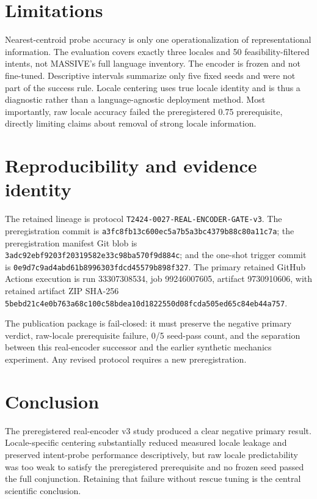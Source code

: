 \documentclass[10pt,twocolumn]{article}
\begin{document}
\section{Limitations}
Nearest-centroid probe accuracy is only one operationalization of representational information. The evaluation covers exactly three locales and 50 feasibility-filtered intents, not MASSIVE's full language inventory. The encoder is frozen and not fine-tuned. Descriptive intervals summarize only five fixed seeds and were not part of the success rule. Locale centering uses true locale identity and is thus a diagnostic rather than a language-agnostic deployment method. Most importantly, raw locale accuracy failed the preregistered 0.75 prerequisite, directly limiting claims about removal of strong locale information.

\section{Reproducibility and evidence identity}
The retained lineage is protocol \nolinkurl{T2424-0027-REAL-ENCODER-GATE-v3}. The preregistration commit is \nolinkurl{a3fc8fb13c600ec5a7b5a3bc4379b88c80a11c7a}; the preregistration manifest Git blob is \nolinkurl{3adc92ebf9203f20319582e33c98ba570f9d884c}; and the one-shot trigger commit is \nolinkurl{0e9d7c9ad4abd61b8996303fdcd45579b898f327}. The primary retained GitHub Actions execution is run 33307308534, job 99246007605, artifact 9730910606, with retained artifact ZIP SHA-256 \nolinkurl{5bebd21c4e0b763a68c100c58bdea10d1822550d08fcda505ed65c84eb44a757}.

The publication package is fail-closed: it must preserve the negative primary verdict, raw-locale prerequisite failure, 0/5 seed-pass count, and the separation between this real-encoder successor and the earlier synthetic mechanics experiment. Any revised protocol requires a new preregistration.

\section{Conclusion}
The preregistered real-encoder v3 study produced a clear negative primary result. Locale-specific centering substantially reduced measured locale leakage and preserved intent-probe performance descriptively, but raw locale predictability was too weak to satisfy the preregistered prerequisite and no frozen seed passed the full conjunction. Retaining that failure without rescue tuning is the central scientific conclusion.
\end{document}
